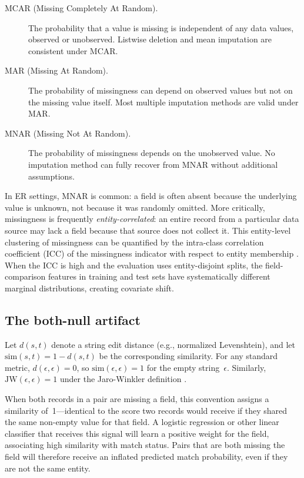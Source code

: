 \documentclass[a4paper]{article}
\begin{document}
\begin{article}
\begin{description}
  \item[MCAR (Missing Completely At Random).] The probability that a
    value is missing is independent of any data values, observed or
    unobserved.  Listwise deletion and mean imputation are consistent
    under MCAR.

  \item[MAR (Missing At Random).] The probability of missingness can
    depend on observed values but not on the missing value itself.
    Most multiple imputation methods are valid under MAR.

  \item[MNAR (Missing Not At Random).] The probability of missingness
    depends on the unobserved value.  No imputation method can
    fully recover from MNAR without additional assumptions.
\end{description}

In ER settings, MNAR is common: a field is often absent because the
underlying value is unknown, not because it was randomly omitted.
More critically, missingness is frequently \emph{entity-correlated}:
an entire record from a particular data source may lack a field because
that source does not collect it.  This entity-level clustering of
missingness can be quantified by the intra-class correlation coefficient
(ICC) of the missingness indicator with respect to entity membership
\citep{ShroutFleiss1979}.  When the ICC is high and the evaluation uses
entity-disjoint splits, the field-comparison features in training and
test sets have systematically different marginal distributions, creating
covariate shift.

\subsection{The both-null artifact}
\label{sec:bg:artifact}

Let $d(s, t)$ denote a string edit distance (e.g., normalized
Levenshtein), and let $\mathrm{sim}(s, t) = 1 - d(s, t)$ be the
corresponding similarity.  For any standard metric, $d(\epsilon,
\epsilon) = 0$, so $\mathrm{sim}(\epsilon, \epsilon) = 1$ for the empty
string~$\epsilon$.  Similarly, $\mathrm{JW}(\epsilon, \epsilon) = 1$
under the Jaro-Winkler definition \citep{Jaro1989, Winkler1990}.

When both records in a pair are missing a field, this convention
assigns a similarity of~1---identical to the score two records would
receive if they shared the same non-empty value for that field. A logistic
regression or other linear classifier that receives this signal will
learn a positive weight for the field, associating high similarity with
match status. Pairs that are both missing the field will therefore
receive an inflated predicted match probability, even if they are not
the same entity.


\end{article}
\end{document}
